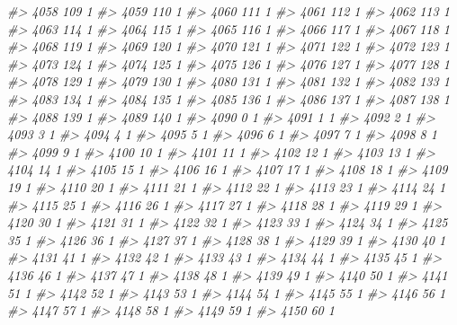\documentclass[]{article}
\newenvironment{Shaded}{\begin{snugshade}}{\end{snugshade}}
\newcommand{\CommentTok}[1]{\textcolor[rgb]{0.56,0.35,0.01}{\textit{#1}}}
\begin{document}
\begin{Shaded}
\begin{Highlighting}[]
\CommentTok{#> 4058 109  1}
\CommentTok{#> 4059 110  1}
\CommentTok{#> 4060 111  1}
\CommentTok{#> 4061 112  1}
\CommentTok{#> 4062 113  1}
\CommentTok{#> 4063 114  1}
\CommentTok{#> 4064 115  1}
\CommentTok{#> 4065 116  1}
\CommentTok{#> 4066 117  1}
\CommentTok{#> 4067 118  1}
\CommentTok{#> 4068 119  1}
\CommentTok{#> 4069 120  1}
\CommentTok{#> 4070 121  1}
\CommentTok{#> 4071 122  1}
\CommentTok{#> 4072 123  1}
\CommentTok{#> 4073 124  1}
\CommentTok{#> 4074 125  1}
\CommentTok{#> 4075 126  1}
\CommentTok{#> 4076 127  1}
\CommentTok{#> 4077 128  1}
\CommentTok{#> 4078 129  1}
\CommentTok{#> 4079 130  1}
\CommentTok{#> 4080 131  1}
\CommentTok{#> 4081 132  1}
\CommentTok{#> 4082 133  1}
\CommentTok{#> 4083 134  1}
\CommentTok{#> 4084 135  1}
\CommentTok{#> 4085 136  1}
\CommentTok{#> 4086 137  1}
\CommentTok{#> 4087 138  1}
\CommentTok{#> 4088 139  1}
\CommentTok{#> 4089 140  1}
\CommentTok{#> 4090   0  1}
\CommentTok{#> 4091   1  1}
\CommentTok{#> 4092   2  1}
\CommentTok{#> 4093   3  1}
\CommentTok{#> 4094   4  1}
\CommentTok{#> 4095   5  1}
\CommentTok{#> 4096   6  1}
\CommentTok{#> 4097   7  1}
\CommentTok{#> 4098   8  1}
\CommentTok{#> 4099   9  1}
\CommentTok{#> 4100  10  1}
\CommentTok{#> 4101  11  1}
\CommentTok{#> 4102  12  1}
\CommentTok{#> 4103  13  1}
\CommentTok{#> 4104  14  1}
\CommentTok{#> 4105  15  1}
\CommentTok{#> 4106  16  1}
\CommentTok{#> 4107  17  1}
\CommentTok{#> 4108  18  1}
\CommentTok{#> 4109  19  1}
\CommentTok{#> 4110  20  1}
\CommentTok{#> 4111  21  1}
\CommentTok{#> 4112  22  1}
\CommentTok{#> 4113  23  1}
\CommentTok{#> 4114  24  1}
\CommentTok{#> 4115  25  1}
\CommentTok{#> 4116  26  1}
\CommentTok{#> 4117  27  1}
\CommentTok{#> 4118  28  1}
\CommentTok{#> 4119  29  1}
\CommentTok{#> 4120  30  1}
\CommentTok{#> 4121  31  1}
\CommentTok{#> 4122  32  1}
\CommentTok{#> 4123  33  1}
\CommentTok{#> 4124  34  1}
\CommentTok{#> 4125  35  1}
\CommentTok{#> 4126  36  1}
\CommentTok{#> 4127  37  1}
\CommentTok{#> 4128  38  1}
\CommentTok{#> 4129  39  1}
\CommentTok{#> 4130  40  1}
\CommentTok{#> 4131  41  1}
\CommentTok{#> 4132  42  1}
\CommentTok{#> 4133  43  1}
\CommentTok{#> 4134  44  1}
\CommentTok{#> 4135  45  1}
\CommentTok{#> 4136  46  1}
\CommentTok{#> 4137  47  1}
\CommentTok{#> 4138  48  1}
\CommentTok{#> 4139  49  1}
\CommentTok{#> 4140  50  1}
\CommentTok{#> 4141  51  1}
\CommentTok{#> 4142  52  1}
\CommentTok{#> 4143  53  1}
\CommentTok{#> 4144  54  1}
\CommentTok{#> 4145  55  1}
\CommentTok{#> 4146  56  1}
\CommentTok{#> 4147  57  1}
\CommentTok{#> 4148  58  1}
\CommentTok{#> 4149  59  1}
\CommentTok{#> 4150  60  1}

\end{Highlighting}
\end{Shaded}
\end{document}

